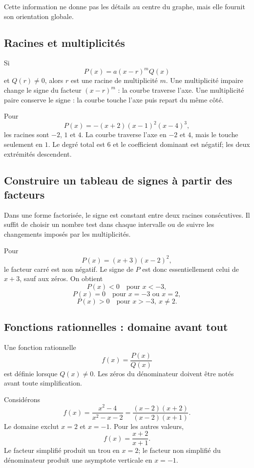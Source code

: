 \documentclass[12pt,a4paper,openany]{book}
\begin{document}
Cette information ne donne pas les détails au centre du graphe, mais elle fournit son orientation globale.

\subsection{Racines et multiplicités}

Si
\[
P(x)=a(x-r)^mQ(x)
\]
et $Q(r)\neq0$, alors $r$ est une racine de multiplicité $m$. Une multiplicité impaire change le signe du facteur $(x-r)^m$ : la courbe traverse l'axe. Une multiplicité paire conserve le signe : la courbe touche l'axe puis repart du même côté.

\begin{examplebox}
Pour
\[
P(x)=-(x+2)(x-1)^2(x-4)^3,
\]
les racines sont $-2$, $1$ et $4$. La courbe traverse l'axe en $-2$ et $4$, mais le touche seulement en $1$. Le degré total est $6$ et le coefficient dominant est négatif; les deux extrémités descendent.
\end{examplebox}

\subsection{Construire un tableau de signes à partir des facteurs}

Dans une forme factorisée, le signe est constant entre deux racines consécutives. Il suffit de choisir un nombre test dans chaque intervalle ou de suivre les changements imposés par les multiplicités.

Pour
\[
P(x)=(x+3)(x-2)^2,
\]
le facteur carré est non négatif. Le signe de $P$ est donc essentiellement celui de $x+3$, sauf aux zéros. On obtient
\[
P(x)<0\quad\text{pour }x<-3,
\]
\[
P(x)=0\quad\text{pour }x=-3\text{ ou }x=2,
\]
\[
P(x)>0\quad\text{pour }x>-3,\ x\neq2.
\]

\subsection{Fonctions rationnelles : domaine avant tout}

Une fonction rationnelle
\[
f(x)=\frac{P(x)}{Q(x)}
\]
est définie lorsque $Q(x)\neq0$. Les zéros du dénominateur doivent être notés avant toute simplification.

Considérons
\[
f(x)=\frac{x^2-4}{x^2-x-2}
=
\frac{(x-2)(x+2)}{(x-2)(x+1)}.
\]
Le domaine exclut $x=2$ et $x=-1$. Pour les autres valeurs,
\[
f(x)=\frac{x+2}{x+1}.
\]
Le facteur simplifié produit un trou en $x=2$; le facteur non simplifié du dénominateur produit une asymptote verticale en $x=-1$.
\end{document}
